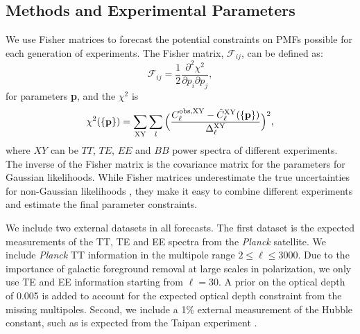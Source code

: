 \documentclass[apj]{emulateapj}
\newcommand{\be}{\begin{equation}}
\newcommand{\ee}{\end{equation}}
\newcommand{\planck}{{\sl Planck}}
\begin{document}
\subsection{Methods and Experimental Parameters}

We use Fisher matrices to forecast the potential constraints on PMFs possible for each generation of experiments. 
The Fisher matrix, $\mathcal{F}_{ij}$, can be defined as:
\be
\mathcal{F}_{ij} = \frac{1}{2} \frac{\partial^2 \chi^2}{\partial p_i \partial p_j},
\ee
for parameters \textbf{p}, and the $\chi^2$ is
\begin{equation}
\chi^2(\{\textbf{p}\})=\displaystyle\sum_{\rm{XY}}\displaystyle\sum_l\Big(\frac{C^{\rm{obs,XY}}_{\ell}-\hat C^{\rm{XY}}_{\ell}(\{\textbf{p}\})}{\Delta^{\rm{XY}}_{\ell}}\Big)^2,
\end{equation}
where $XY$ can be $TT$, $TE$, $EE$ and $BB$ power spectra of different experiments.
The inverse of the Fisher matrix is the covariance matrix for the parameters for Gaussian likelihoods. 
While Fisher matrices underestimate the true uncertainties for non-Gaussian likelihoods \citep[see e.g.,][]{wolz12}, they 
 make it easy to combine different experiments and estimate the final parameter constraints.  


We include two external datasets in all forecasts. 
The first dataset is the expected measurements of the  TT, TE and EE spectra from the \planck{} satellite. 
We include \planck{} TT information in the multipole range $2\le \ell \le 3000$. 
Due to the importance of galactic foreground removal at large scales in polarization, we only use TE and EE information starting from $\ell = 30$. 
A prior on the optical depth of 0.005 is added to account for the expected optical depth constraint from the missing multipoles. 
Second, we include a 1\% external measurement of the Hubble constant, such as is expected from the Taipan experiment \citep{kuehn14}. 
\end{document}
